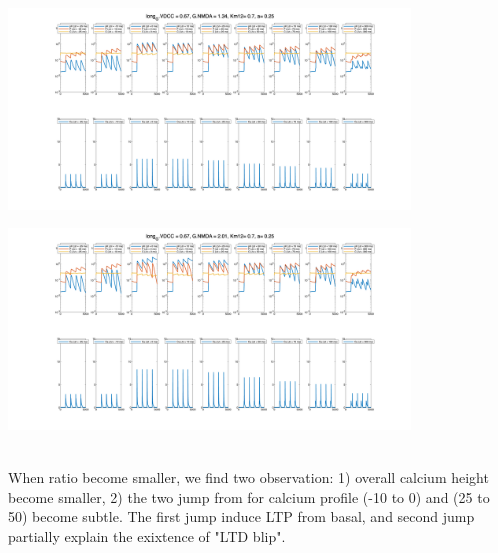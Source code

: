 \documentclass{article}
\begin{document}
\begin{minipage}{\textwidth} %
    \centering
    \includegraphics[width=0.8\textwidth]{short_G_VDCC=0.67_G_NMDA=1.34_Km12=0.700_a=0.25.png} %
    \label{fig:a0.25}
\end{minipage}
\begin{minipage}{\textwidth} %
    \centering
    \includegraphics[width=0.8\textwidth]{short_G_VDCC=0.67_G_NMDA=2.01_Km12=0.700_a=0.25.png} %
    \label{fig:a0.25}
\end{minipage}
\\
When ratio become smaller, we find two observation: 1) overall calcium height become smaller, 2) the two jump from for calcium profile (-10 to 0) and (25 to 50) become subtle. The first jump induce LTP from basal, and second jump partially explain the exixtence of "LTD blip".
\end{document}
